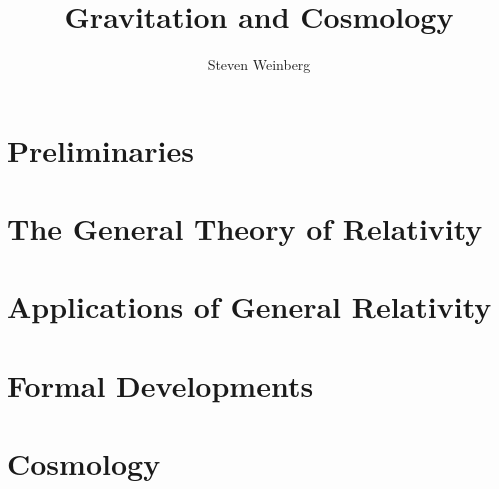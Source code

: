 \documentclass[11pt,a4paper]{article}
\title{Gravitation and Cosmology}
\author{Steven Weinberg}
\affiliation{Massachusetts Institute of Technology}
\newcommand{\bookpart}[1]{%
  \clearpage
  \thispagestyle{empty}%
  \vspace*{\fill}
  \part{#1}
  \vspace*{\fill}
  \clearpage
}
\begin{document}
\maketitle




\clearpage
\tableofcontents

\clearpage
{}
\flushbottom

\bookpart{Preliminaries}



\bookpart{The General Theory of Relativity}






\bookpart{Applications of General Relativity}





\bookpart{Formal Developments}



\bookpart{Cosmology}






\end{document}
